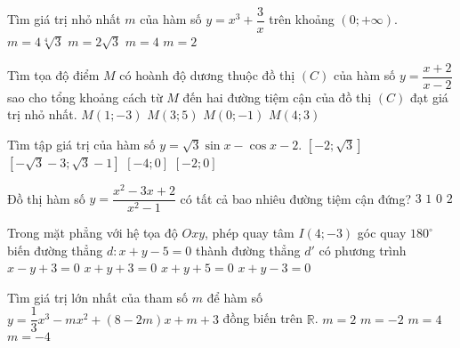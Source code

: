 \begin{ex}%
Tìm giá trị nhỏ nhất $m$ của hàm số $y=x^3+\dfrac{3}{x}$ trên khoảng $(0;+\infty)$.
\choice
{$m=4\sqrt[4]{3}$}
{$m=2\sqrt{3}$}
{\True $m=4$}
{$m=2$}
\end{ex}
\begin{ex}%
Tìm tọa độ điểm $M$ có hoành độ dương thuộc đồ thị $(C)$ của hàm số $y=\dfrac{x+2}{x-2}$ sao cho tổng khoảng cách từ $M$ đến hai đường tiệm cận của đồ thị $(C)$ đạt giá trị nhỏ nhất.
\choice
{$M(1;-3)$}
{$M(3;5)$}
{$M(0;-1)$}
{\True $M(4;3)$}
\end{ex}
\begin{ex}%
Tìm tập giá trị của hàm số $y=\sqrt{3}\sin x-\cos x-2$.
\choice
{$[-2;\sqrt{3}]$}
{$[-\sqrt{3}-3;\sqrt{3}-1]$}
{\True $[-4;0]$}
{$[-2;0]$}
\end{ex}
\begin{ex}%
Đồ thị hàm số $y=\dfrac{x^2-3x+2}{x^2-1}$ có tất cả bao nhiêu đường tiệm cận đứng?
\choice
{$3$}
{\True $1$}
{$0$}
{$2$}
\end{ex}
\begin{ex}%
Trong mặt phẳng với hệ tọa độ $Oxy$, phép quay tâm $I(4;-3)$ góc quay $180^{\circ}$ biến đường thẳng $d: x+y-5=0$ thành đường thẳng $d'$ có phương trình
\choice
{$x-y+3=0$}
{\True $x+y+3=0$}
{$x+y+5=0$}
{$x+y-3=0$}
\end{ex}
\begin{ex}%
Tìm giá trị lớn nhất của tham số $m$ để hàm số $y=\dfrac{1}{3}x^3-mx^2+(8-2m)x+m+3$ đồng biến
trên $\mathbb{R}$.
\choice
{\True $m=2$}
{$m=-2$}
{$m=4$}
{$m=-4$}
\end{ex}
\begin{ex}%
{
}
\end{ex}
